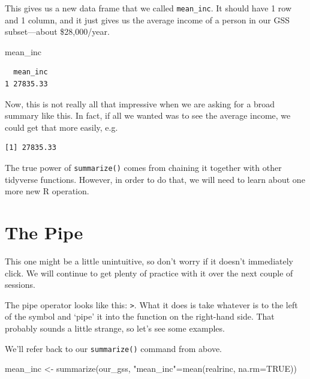 \documentclass[
  letterpaper,
  DIV=11,
  numbers=noendperiod]{scrreprt}
\newenvironment{Shaded}{\begin{snugshade}}{\end{snugshade}}
\newcommand{\AttributeTok}[1]{\textcolor[rgb]{0.40,0.45,0.13}{#1}}
\newcommand{\ConstantTok}[1]{\textcolor[rgb]{0.56,0.35,0.01}{#1}}
\newcommand{\FunctionTok}[1]{\textcolor[rgb]{0.28,0.35,0.67}{#1}}
\newcommand{\NormalTok}[1]{\textcolor[rgb]{0.00,0.23,0.31}{#1}}
\newcommand{\OtherTok}[1]{\textcolor[rgb]{0.00,0.23,0.31}{#1}}
\newcommand{\SpecialCharTok}[1]{\textcolor[rgb]{0.37,0.37,0.37}{#1}}
\newcommand{\StringTok}[1]{\textcolor[rgb]{0.13,0.47,0.30}{#1}}
\begin{document}
This gives us a new data frame that we called \texttt{mean\_inc}. It
should have 1 row and 1 column, and it just gives us the average income
of a person in our GSS subset---about \$28,000/year.

\begin{Shaded}
\begin{Highlighting}[]
\NormalTok{mean\_inc}
\end{Highlighting}
\end{Shaded}

\begin{verbatim}
  mean_inc
1 27835.33
\end{verbatim}

Now, this is not really all that impressive when we are asking for a
broad summary like this. In fact, if all we wanted was to see the
average income, we could get that more easily, e.g.

\begin{Shaded}
\end{Shaded}

\begin{verbatim}
[1] 27835.33
\end{verbatim}

The true power of \texttt{summarize()} comes from chaining it together
with other tidyverse functions. However, in order to do that, we will
need to learn about one more new R operation.

\section{The Pipe}\label{the-pipe}

This one might be a little unintuitive, so don't worry if it doesn't
immediately click. We will continue to get plenty of practice with it
over the next couple of sessions.

The pipe operator looks like this: \texttt{\textbar{}\textgreater{}}.
What it does is take whatever is to the left of the symbol and `pipe' it
into the function on the right-hand side. That probably sounds a little
strange, so let's see some examples.

We'll refer back to our \texttt{summarize()} command from above.

\begin{Shaded}
\begin{Highlighting}[]
\NormalTok{mean\_inc }\OtherTok{\textless{}{-}} \FunctionTok{summarize}\NormalTok{(our\_gss, }\StringTok{"mean\_inc"}\OtherTok{=}\FunctionTok{mean}\NormalTok{(realrinc, }\AttributeTok{na.rm=}\ConstantTok{TRUE}\NormalTok{))}
\end{Highlighting}
\end{Shaded}
\end{document}
